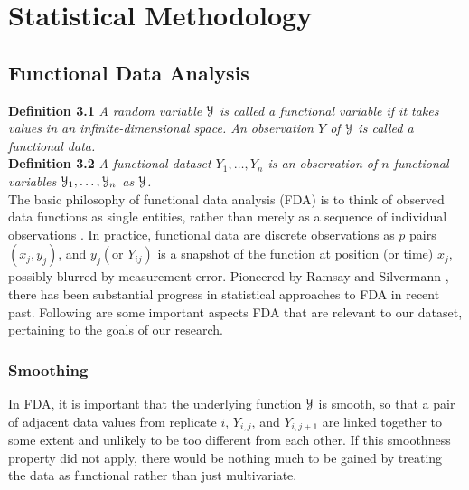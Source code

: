 \chapter{Statistical Methodology}

\section{Functional Data Analysis}
\noindent
{\bf{Definition 3.1}} {\emph{A random variable $\mathcal{Y}$ is called a functional variable if it takes values in an infinite-dimensional space. An observation $Y$ of $\mathcal{Y}$ is called a functional data. \cite{Ferraty_Vieu_2006_Nonparametric}}}\\
\noindent
{\bf{Definition 3.2}} {\emph{A functional dataset $Y_1, \dots, Y_n$ is an observation of $n$ functional variables $\mathcal{Y}_1, \dots, \mathcal{Y}_n$ as $\mathcal{Y}$.}}\\

The basic philosophy of functional data analysis (FDA) is to think of observed data functions as single entities, rather than merely as a sequence of individual observations \cite{Ramsay_2006_Functional}. In
practice, functional data are discrete observations as $p$ pairs $(x_j, y_j)$, and $y_j (\text{or } Y_{ij})$ is a snapshot of the function at position (or time) $x_j$, possibly blurred by measurement error. Pioneered by Ramsay and Silvermann \cite{Ramsay_2006_Functional}, there has been substantial progress in statistical approaches to FDA in recent past. Following are some important aspects FDA that are relevant to our dataset, pertaining to the goals of our research. 

\subsection{Smoothing}
In FDA, it is important that the underlying function $\mathcal{Y}$ is smooth, so that a pair of adjacent data values from replicate $i$, $Y_{i,j}$, and $Y_{i,j+1}$ are linked together to some extent and unlikely to be too different from each other. If this smoothness property did not apply, there would be nothing much to be gained by treating the data as functional rather than just multivariate. 


